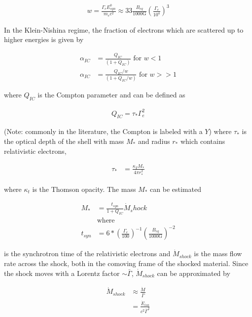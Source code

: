 \documentclass[linenumbers]{aastex631}
\begin{document}
\begin{align}
	w = \frac{\Gamma_e E_{syn}^0}{m_e c^2} \approx 33 \frac{B_{eq}}{1000\text{G}}\left(\frac{\Gamma_e}{10^4}\right)^3
\end{align}

In the Klein-Nishina regime, the fraction of electrons which are scattered up to higher energies is given by 

\begin{align}
	\alpha_{IC} &= \frac{Q_{IC}}{(1+Q_{IC})} \text{ for } w < 1 \\
	\alpha_{IC} &= \frac{Q_{IC}/w}{(1+Q_{IC}/w)} \text{ for } w >> 1 
\end{align}

where $Q_{IC}$ is the Compton parameter and can be defined as 

\begin{align}
	Q_{IC} = \tau_{*}\Gamma_e^2
\end{align}

(Note: commonly in the literature, the Compton is labeled with a $Y$) where $\tau_{*}$ is the optical depth of the shell with mass $M_{*}$ and radius $r_{*}$ which contains relativistic electrons, 

\begin{align} \label{eq: QIC p1}
	\tau_{*} &= \frac{\kappa_T M_{*}}{4 \pi r_{*}^2}
\end{align}

where $\kappa_t$ is the Thomson opacity. The mass $M_{*}$ can be estimated

\begin{align} \label{eq: QIC p2}
	M_{*} &= \frac{t_{syn}}{1+Q_{IC}} \dot{M}_shock \\
	&\text{where}\\
	t_{syn} &= 6*\left(\frac{\Gamma_e}{100}\right)^{-1} \left(\frac{B_{eq}}{1000\text{G}}\right)^{-2}
\end{align}

is the synchrotron time of the relativistic electrons and $\dot{M}_{shock}$ is the mass flow rate across the shock, both in the comoving frame of the shocked material. Since the shock moves with a Lorentz factor $\sim \bar{\Gamma}$, $\dot{M}_{shock}$ can be approximated by 

\begin{align} \label{eq: QIC p3}
	\dot{M}_{shock} &\approx \frac{\dot{M}}{\bar{\Gamma}} \\
	&= \frac{\dot{E}_{iso}}{c^2 \bar{\Gamma}^2} 
\end{align}
\end{document}

